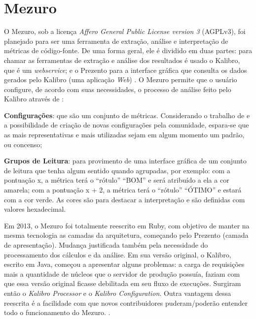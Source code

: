 \chapter{Mezuro}\label{chap:mezuro}

O Mezuro, sob a licença \textit{Affero General Public License version 3} (AGPLv3),
foi planejado para ser uma ferramenta de extração, análise e interpretação de
métricas de código-fonte. De uma forma geral, ele é dividido em duas partes:
para chamar as ferramentas de extração e análise dos resultados é usado o
Kalibro, que é um \textit{webservice}; e o Prezento para a interface gráfica que
consulta os dados gerados pelo Kalibro (uma aplicação \textit{Web})
\cite{meirellesCibse2015}. O Mezuro permite que o usuário configure, de acordo
com suas necessidades, o processo de análise feito pelo Kalibro através de
\cite{camarinhaOSS2015}:

\begin{description}
  \item \textbf{Configurações}: que são um conjunto de métricas. Considerando o
  trabalho de  e a possibilidade de
  criação de novas configurações pela comunidade, espara-se que as mais
  representativas e mais utilizadas sejam em algum momento um padrão, ou
  concenso;
  \item \textbf{Grupos de Leitura}:  para provimento de uma
  interface gráfica de um conjunto de leitura que tenha algum sentido quando
  agrupadas, por exemplo: com a pontuação x, a métrica terá o ``rótulo'' ``BOM'' e
  será atribuído a ela a cor amarela; com a pontuação x + 2, a métrica terá o
  ``rótulo'' ``ÓTIMO'' e estará com a cor verde. As cores são para destacar a
  interpretação e são definidas com valores hexadecimal.
\end{description}

Em 2013, o Mezuro foi totalmente reescrito em Ruby, com objetivo de manter na
mesma tecnologia as camadas da arquitetura, começando pelo Prezento (camada de
apresentação). Mudança justificada também pela necessidade do processamento dos
cálculos e da análise. Em sua versão original, o Kalibro, escrito em Java,
começou a apresentar alguns problemas: a carga de requisições mais a quantidade
de núcleos que o servidor de produção possuía, faziam com que essa versão
original ficasse debilitada em seu fluxo de execuções. Surgiram então o
\textit{Kalibro Processor} e o \textit{Kalibro Configuration}. Outra vantagem
dessa reescrita é a facilidade com que novos contribuidores puderam/poderão
entender todo o funcionamento do Mezuro. \cite{meirellesCibse2015}.

